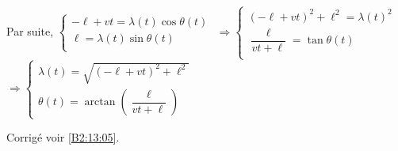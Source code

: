 Par suite,
$\left\{
\begin{array}{l}
-\ell+vt  = \lambda(t) \cos \theta(t) \\
\ell = \lambda(t) \sin \theta(t) \\
\end{array}
\right.$ 
$\Rightarrow 
\left\{
\begin{array}{l}
\left(-\ell+vt\right)^2 + \ell^2   = \lambda(t)^2  \\
\dfrac{\ell}{vt+\ell} =  \tan \theta(t) \\
\end{array}
\right.$ 
$\Rightarrow 
\left\{
\begin{array}{l}
\lambda(t) = \sqrt{\left(-\ell+vt\right)^2 + \ell^2}\\
\theta(t) = \arctan \left( \dfrac{\ell}{vt+\ell} \right)
\end{array}
\right.$ 

\else
\fi


\ifprof
\else
\fi

\ifprof
\else
\begin{flushright}
\footnotesize{Corrigé  voir \ref{B2:13:05}.}
\end{flushright}%
\fi